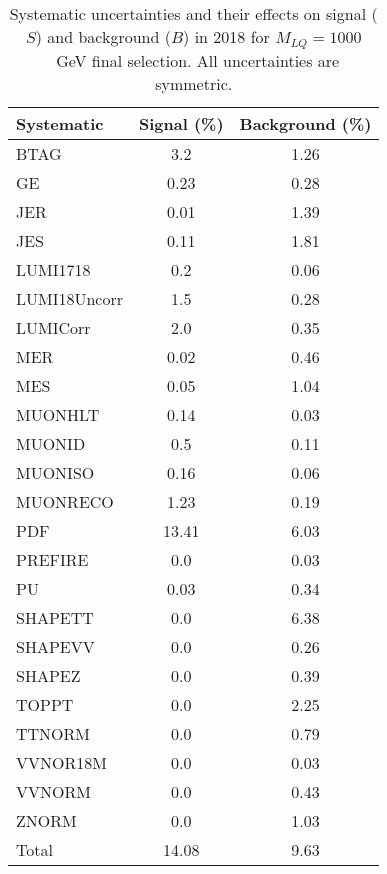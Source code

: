 \begin{table}[htbp]
\begin{center}
\caption{Systematic uncertainties and their effects on signal ($S$) and background ($B$) in 2018 for $M_{LQ}=1000$~GeV final selection. All uncertainties are symmetric.}
\begin{tabular}{lcc}
\hline\hline
Systematic & Signal (\%) & Background (\%) \\ \hline 
BTAG & 3.2 & 1.26\\ 
GE & 0.23 & 0.28\\ 
JER & 0.01 & 1.39\\ 
JES & 0.11 & 1.81\\ 
LUMI1718 & 0.2 & 0.06\\ 
LUMI18Uncorr & 1.5 & 0.28\\ 
LUMICorr & 2.0 & 0.35\\ 
MER & 0.02 & 0.46\\ 
MES & 0.05 & 1.04\\ 
MUONHLT & 0.14 & 0.03\\ 
MUONID & 0.5 & 0.11\\ 
MUONISO & 0.16 & 0.06\\ 
MUONRECO & 1.23 & 0.19\\ 
PDF & 13.41 & 6.03\\ 
PREFIRE & 0.0 & 0.03\\ 
PU & 0.03 & 0.34\\ 
SHAPETT & 0.0 & 6.38\\ 
SHAPEVV & 0.0 & 0.26\\ 
SHAPEZ & 0.0 & 0.39\\ 
TOPPT & 0.0 & 2.25\\ 
TTNORM & 0.0 & 0.79\\ 
VVNOR18M & 0.0 & 0.03\\ 
VVNORM & 0.0 & 0.43\\ 
ZNORM & 0.0 & 1.03\\ 
Total & 14.08 & 9.63\\ \hline \hline
\end{tabular}
\label{tab:SysUncertainties_uujj_1000}
\end{center}
\end{table}

